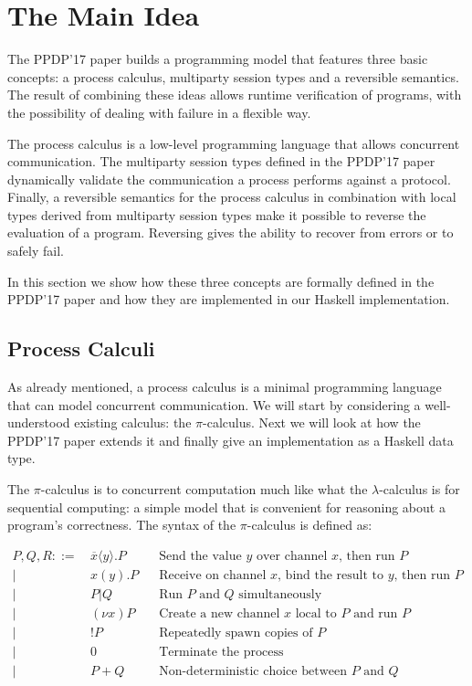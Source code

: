 \documentclass[runningheads,plain]{llncs}
\begin{document}
\section{The Main Idea}\label{the-main-idea}

The PPDP'17 paper builds a programming model that features three basic
concepts: a process calculus, multiparty session types and a reversible
semantics. The result of combining these ideas allows runtime
verification of programs, with the possibility of dealing with failure
in a flexible way.

The process calculus is a low-level programming language that allows
concurrent communication. The multiparty session types defined in the
PPDP'17 paper dynamically validate the communication a process performs
against a protocol. Finally, a reversible semantics for the process
calculus in combination with local types derived from multiparty session
types make it possible to reverse the evaluation of a program. Reversing
gives the ability to recover from errors or to safely fail.

In this section we show how these three concepts are formally defined in
the PPDP'17 paper and how they are implemented in our Haskell
implementation.

\subsection{Process Calculi}\label{process-calculi}

As already mentioned, a process calculus is a minimal programming
language that can model concurrent communication. We will start by
considering a well-understood existing calculus: the \(\pi\)-calculus.
Next we will look at how the PPDP'17 paper extends it and finally give
an implementation as a Haskell data type.

The \(\pi\)-calculus is to concurrent computation much like what the
\(\lambda\)-calculus is for sequential computing: a simple model that is
convenient for reasoning about a program's correctness. The syntax of
the \(\pi\)-calculus is defined as:

\begin{align*}
P, Q, R ::= \, & \overline{x} \langle y \rangle.P \,\,\, \, \, &\text{Send the value }y\text{ over channel }x\text{, then run }P \\
|\,\,\, & x(y).P \,\,\, \, \, & \text{Receive on channel }x\text{, bind the result to }y\text{, then run }P \\
|\,\,\, & P|Q \,\,\, \, \, \, \, \, \, &\text{Run }P\text{ and }Q\text{ simultaneously} \\
|\,\,\, & (\nu x)P  \,\,\, &\text{Create a new channel }x\text{ local to } P \text{ and run }P \\
|\,\,\, & !P \,\,\, &\text{Repeatedly spawn copies of }P \\
|\,\,\, & 0 & \text{Terminate the process} \\
|\,\,\, & P+Q \,\,\, \, \, \, \, \, \, &\text{Non-deterministic choice between }P\text{ and }Q\\
\end{align*}
\end{document}
